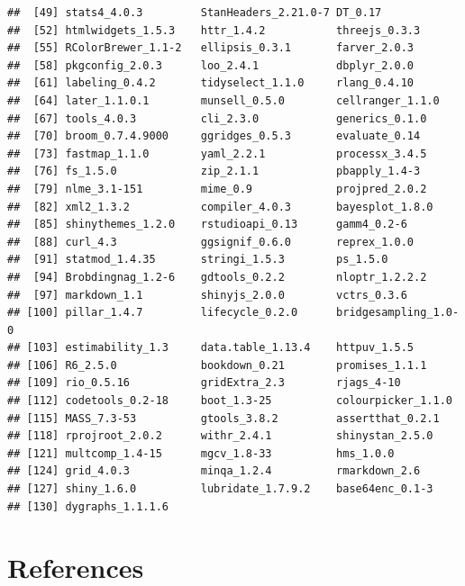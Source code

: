 \documentclass[
  11pt,
  english,
  ,doc,floatsintext]{apa6}
\begin{document}
\begin{verbatim}
##  [49] stats4_4.0.3         StanHeaders_2.21.0-7 DT_0.17             
##  [52] htmlwidgets_1.5.3    httr_1.4.2           threejs_0.3.3       
##  [55] RColorBrewer_1.1-2   ellipsis_0.3.1       farver_2.0.3        
##  [58] pkgconfig_2.0.3      loo_2.4.1            dbplyr_2.0.0        
##  [61] labeling_0.4.2       tidyselect_1.1.0     rlang_0.4.10        
##  [64] later_1.1.0.1        munsell_0.5.0        cellranger_1.1.0    
##  [67] tools_4.0.3          cli_2.3.0            generics_0.1.0      
##  [70] broom_0.7.4.9000     ggridges_0.5.3       evaluate_0.14       
##  [73] fastmap_1.1.0        yaml_2.2.1           processx_3.4.5      
##  [76] fs_1.5.0             zip_2.1.1            pbapply_1.4-3       
##  [79] nlme_3.1-151         mime_0.9             projpred_2.0.2      
##  [82] xml2_1.3.2           compiler_4.0.3       bayesplot_1.8.0     
##  [85] shinythemes_1.2.0    rstudioapi_0.13      gamm4_0.2-6         
##  [88] curl_4.3             ggsignif_0.6.0       reprex_1.0.0        
##  [91] statmod_1.4.35       stringi_1.5.3        ps_1.5.0            
##  [94] Brobdingnag_1.2-6    gdtools_0.2.2        nloptr_1.2.2.2      
##  [97] markdown_1.1         shinyjs_2.0.0        vctrs_0.3.6         
## [100] pillar_1.4.7         lifecycle_0.2.0      bridgesampling_1.0-0
## [103] estimability_1.3     data.table_1.13.4    httpuv_1.5.5        
## [106] R6_2.5.0             bookdown_0.21        promises_1.1.1      
## [109] rio_0.5.16           gridExtra_2.3        rjags_4-10          
## [112] codetools_0.2-18     boot_1.3-25          colourpicker_1.1.0  
## [115] MASS_7.3-53          gtools_3.8.2         assertthat_0.2.1    
## [118] rprojroot_2.0.2      withr_2.4.1          shinystan_2.5.0     
## [121] multcomp_1.4-15      mgcv_1.8-33          hms_1.0.0           
## [124] grid_4.0.3           minqa_1.2.4          rmarkdown_2.6       
## [127] shiny_1.6.0          lubridate_1.7.9.2    base64enc_0.1-3     
## [130] dygraphs_1.1.1.6
\end{verbatim}

\newpage

\hypertarget{references}{%
\section*{References}\label{references}}
\end{document}
